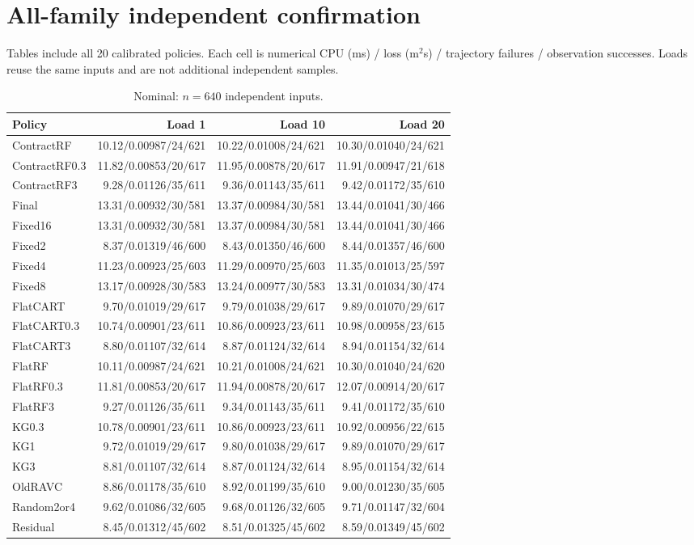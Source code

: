 \FloatBarrier
\section{All-family independent confirmation}
Tables include all 20 calibrated policies. Each cell is numerical CPU (ms) / loss (m$^2$s) / trajectory failures / observation successes. Loads reuse the same inputs and are not additional independent samples.
\begin{table}[!htbp]\centering\scriptsize
\caption{Nominal: $n=640$ independent inputs.}\label{supp:confirmnominal_confirmation}
\begin{tabular}{@{}lrrr@{}}\toprule
Policy & Load 1 & Load 10 & Load 20\\\midrule
ContractRF & 10.12/0.00987/24/621 & 10.22/0.01008/24/621 & 10.30/0.01040/24/621\\
ContractRF0.3 & 11.82/0.00853/20/617 & 11.95/0.00878/20/617 & 11.91/0.00947/21/618\\
ContractRF3 & 9.28/0.01126/35/611 & 9.36/0.01143/35/611 & 9.42/0.01172/35/610\\
Final & 13.31/0.00932/30/581 & 13.37/0.00984/30/581 & 13.44/0.01041/30/466\\
Fixed16 & 13.31/0.00932/30/581 & 13.37/0.00984/30/581 & 13.44/0.01041/30/466\\
Fixed2 & 8.37/0.01319/46/600 & 8.43/0.01350/46/600 & 8.44/0.01357/46/600\\
Fixed4 & 11.23/0.00923/25/603 & 11.29/0.00970/25/603 & 11.35/0.01013/25/597\\
Fixed8 & 13.17/0.00928/30/583 & 13.24/0.00977/30/583 & 13.31/0.01034/30/474\\
FlatCART & 9.70/0.01019/29/617 & 9.79/0.01038/29/617 & 9.89/0.01070/29/617\\
FlatCART0.3 & 10.74/0.00901/23/611 & 10.86/0.00923/23/611 & 10.98/0.00958/23/615\\
FlatCART3 & 8.80/0.01107/32/614 & 8.87/0.01124/32/614 & 8.94/0.01154/32/614\\
FlatRF & 10.11/0.00987/24/621 & 10.21/0.01008/24/621 & 10.30/0.01040/24/620\\
FlatRF0.3 & 11.81/0.00853/20/617 & 11.94/0.00878/20/617 & 12.07/0.00914/20/617\\
FlatRF3 & 9.27/0.01126/35/611 & 9.34/0.01143/35/611 & 9.41/0.01172/35/610\\
KG0.3 & 10.78/0.00901/23/611 & 10.86/0.00923/23/611 & 10.92/0.00956/22/615\\
KG1 & 9.72/0.01019/29/617 & 9.80/0.01038/29/617 & 9.89/0.01070/29/617\\
KG3 & 8.81/0.01107/32/614 & 8.87/0.01124/32/614 & 8.95/0.01154/32/614\\
OldRAVC & 8.86/0.01178/35/610 & 8.92/0.01199/35/610 & 9.00/0.01230/35/605\\
Random2or4 & 9.62/0.01086/32/605 & 9.68/0.01126/32/605 & 9.71/0.01147/32/604\\
Residual & 8.45/0.01312/45/602 & 8.51/0.01325/45/602 & 8.59/0.01349/45/602\\
\bottomrule\end{tabular}\end{table}

